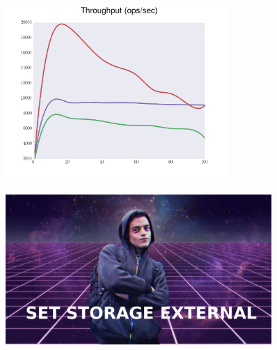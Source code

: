\documentclass[usenames,dvipsnames, 18pt, compress, aspectratio=169]{beamer}
\begin{document}
\begin{frame}
    \frametitle{}
    \begin{center}
    \begin{figure}
        \includegraphics[width=0.75\textwidth,center]{benchmarks/workload_c_select_slice/throughput.png}
    \end{figure}
    \end{center}
\end{frame}

\begin{frame}
    \frametitle{}
    \begin{center}
    \begin{figure}
        \includegraphics[width=0.9\textwidth,center]{hack.jpg}
    \end{figure}
    \end{center}
\end{frame}

\end{document}
